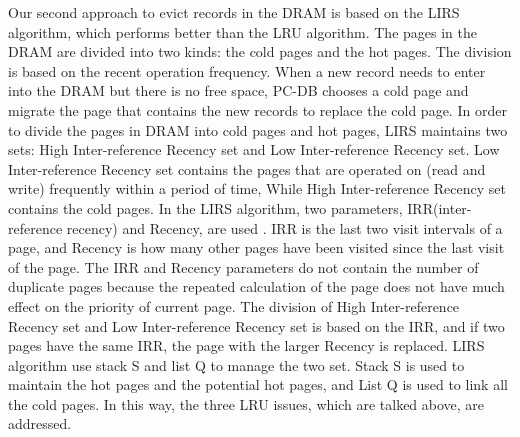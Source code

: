 Our second approach to evict records in the DRAM is based on the LIRS algorithm, which performs better than the LRU algorithm. The pages in the DRAM are divided into two kinds: the cold pages and the hot pages. The division is based on the recent operation frequency. When a new record needs to enter into the DRAM but there is no free space, PC-DB chooses a cold page and migrate the page that contains the new records to replace the cold page. In order to divide the pages in DRAM into cold pages and hot pages, LIRS maintains two sets: High Inter-reference Recency set and Low Inter-reference Recency set. Low Inter-reference Recency set contains the pages that are operated on (read and write) frequently within a period of time, While High Inter-reference Recency set contains the cold pages. In the LIRS algorithm, two parameters, IRR(inter-reference recency) and Recency, are used . IRR is the last two visit intervals of a page, and Recency is how many other pages have been visited since the last visit of the page. The IRR and Recency parameters do not contain the number of duplicate pages because the repeated calculation of the page does not have much effect on the priority of current page. The division of High Inter-reference Recency set and Low Inter-reference Recency set is based on the IRR, and if two pages have the same IRR, the page with the larger Recency is replaced. LIRS algorithm use stack S and list Q to manage the two set. Stack S is used to maintain the hot pages and the potential hot pages, and List Q is used to link all the cold pages. In this way, the three LRU issues, which are talked above, are addressed. 
